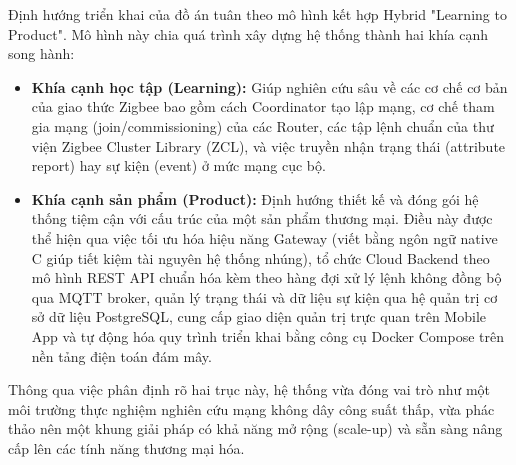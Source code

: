 Định hướng triển khai của đồ án tuân theo mô hình kết hợp Hybrid "Learning to Product". Mô hình này chia quá trình xây dựng hệ thống thành hai khía cạnh song hành:
\begin{itemize}
    \item \textbf{Khía cạnh học tập (Learning):} Giúp nghiên cứu sâu về các cơ chế cơ bản của giao thức Zigbee bao gồm cách Coordinator tạo lập mạng, cơ chế tham gia mạng (join/commissioning) của các Router, các tập lệnh chuẩn của thư viện Zigbee Cluster Library (ZCL), và việc truyền nhận trạng thái (attribute report) hay sự kiện (event) ở mức mạng cục bộ.
    \item \textbf{Khía cạnh sản phẩm (Product):} Định hướng thiết kế và đóng gói hệ thống tiệm cận với cấu trúc của một sản phẩm thương mại. Điều này được thể hiện qua việc tối ưu hóa hiệu năng Gateway (viết bằng ngôn ngữ native C giúp tiết kiệm tài nguyên hệ thống nhúng), tổ chức Cloud Backend theo mô hình REST API chuẩn hóa kèm theo hàng đợi xử lý lệnh không đồng bộ qua MQTT broker, quản lý trạng thái và dữ liệu sự kiện qua hệ quản trị cơ sở dữ liệu PostgreSQL, cung cấp giao diện quản trị trực quan trên Mobile App và tự động hóa quy trình triển khai bằng công cụ Docker Compose trên nền tảng điện toán đám mây.
\end{itemize}

Thông qua việc phân định rõ hai trục này, hệ thống vừa đóng vai trò như một môi trường thực nghiệm nghiên cứu mạng không dây công suất thấp, vừa phác thảo nên một khung giải pháp có khả năng mở rộng (scale-up) và sẵn sàng nâng cấp lên các tính năng thương mại hóa.

